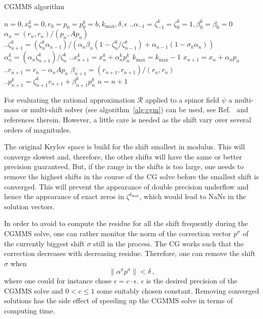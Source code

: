 \begin{algorithm}
  \caption{CGMMS algorithm}
  \label{alg:cgm}
  \begin{algorithmic}[1]
    \vspace{.2cm}
    \STATE $n=0, x_0^k = 0, r_0 = p_0 = p_0^k = b, k_\mathrm{max},
    \delta, \epsilon$
    \STATE  $\biggl.\biggr.\alpha_{-1} = \zeta_{-1}^k = \zeta_0^k = 1, \beta_0^k = \beta_0 = 0$
    \REPEAT
    \STATE $\alpha_n = (r_n, r_n) / (p_n, A p_n)$
    \STATE $\biggl.\biggr.\zeta_{n+1}^k = (\zeta^k_n  \alpha_{n-1}) / 
      (\alpha_n \beta_n(1 - \zeta_n^k / \zeta^k_{n-1}) + \alpha_{n-1}
      (1-\sigma_k\alpha_n))$
    \STATE $\alpha^k_n = (\alpha_n \zeta_{n+1}^k)/ \zeta_n^k$
    \STATE $\biggl.\biggr.x_{n+1}^k = x_n^k + \alpha_n^k p_n^k$
    \STATE $k_\mathrm{max} = k_\mathrm{max} -1$
    \ENDIF
    \ENDFOR
    \STATE $x_{n+1} = x_n + \alpha_n p_n$
    \STATE $\biggl.\biggr.r_{n+1} = r_n - \alpha_n Ap_n$
    \STATE $\beta_{n+1} = (r_{n+1}, r_{n+1}) / (r_n, r_n)$
    \STATE $\biggl.\biggr.p_{n+1}^k = \zeta_{n+1}^k r_{n+1} + \beta_{n+1}^k p_n^k$
    \STATE $n=n+1$
  \end{algorithmic}
\end{algorithm}


For evaluating the rational approximation $\mathcal{R}$ applied to a
spinor field $\psi$ a multi-mass or multi-shift solver (see
algorithm~\ref{alg:cgm}) can be used, see Ref.~\cite{Chiarappa:2006hz}
and references therein. However, a little care is needed
as the shift vary over several orders of magnitudes.

The original Krylov space is build for the shift smallest in
modulus. This will converge slowest and, therefore, the other shifts
will have the same or better precision guaranteed. But, if the
range in the shifts is too large, one needs to remove the highest
shifts in the course of the CG solve before the smallest shift is
converged. This will prevent the appearance of double precision
underflow and hence the appearance of exact zeros in
$\zeta^{k_\mathrm{max}}$, which would lead to 
NaNs in the solution vectors.

In order to avoid to compute the residue for all the shift frequently
during the CGMMS solve, one can rather monitor the norm of the
correction vector $p^\sigma$ of the currently biggest shift $\sigma$
still in the process. The CG works such that the correction decreases
with decreasing residue. Therefore, one can remove the shift $\sigma$
when
\[
\|\alpha^\sigma p^\sigma\| < \delta\,,
\]
where one could for instance chose $\epsilon =
c\cdot\epsilon$. $\epsilon$ is the desired precision of the CGMMS
solve and $0<c\leq1$ some suitably chosen constant. Removing converged
solutions has the side effect of speeding up the CGMMS solve in terms
of computing time.

